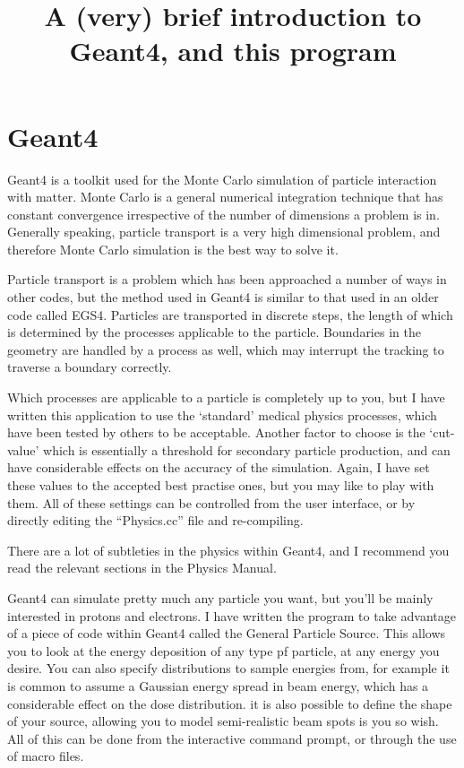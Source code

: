 \documentclass{article}
\begin{document}
\title{A (very) brief introduction to Geant4, and this program}

\section{Geant4}
Geant4 is a toolkit used for the Monte Carlo simulation of particle interaction with matter. Monte Carlo is a general numerical integration technique that has constant convergence irrespective of the number of dimensions a problem is in. Generally speaking, particle transport is a very high dimensional problem, and therefore Monte Carlo simulation is the best way to solve it.

Particle transport is a problem which has been approached a number of ways in other codes, but the method used in Geant4 is similar to that used in an older code called EGS4. Particles are transported in discrete steps, the length of which is determined by the processes applicable to the particle. Boundaries in the geometry are handled by a process as well, which may interrupt the tracking to traverse a boundary correctly. 

Which processes are applicable to a particle is completely up to you, but I have written this application to use the `standard' medical physics processes, which have been tested by others to be acceptable. Another factor to choose is the `cut-value' which is essentially a threshold for secondary particle production, and can have considerable effects on the accuracy of the simulation. Again, I have set these values to the accepted best practise ones, but you may like to play with them. All of these settings can be controlled from the user interface, or by directly editing the ``Physics.cc'' file and re-compiling.

There are a lot of subtleties in the physics within Geant4, and I recommend you read the relevant sections in the Physics Manual.

Geant4 can simulate pretty much any particle you want, but you'll be mainly interested in protons and electrons. I have written the program to take advantage of a piece of code within Geant4 called the General Particle Source. This allows you to look at the energy deposition of any type pf particle, at any energy you desire. You can also specify distributions to sample energies from, for example it is common to assume a Gaussian energy spread in beam energy, which has a considerable effect on the dose distribution. it is also possible to define the shape of your source, allowing you to model semi-realistic beam spots is you so wish. All of this can be done from the interactive command prompt, or through the use of macro files.
\end{document}

